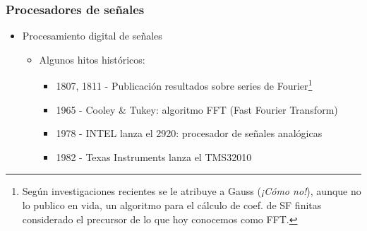 \begin{frame}\frametitle{Procesadores de señales}
  \begin{center}
  \end{center}
  \begin{itemize}
    \item Procesamiento digital de señales
    \begin{itemize}
      \item Algunos hitos históricos:
      \begin{itemize}
        \item 1807, 1811 - Publicación resultados sobre series de Fourier\footnote{Según investigaciones recientes se le atribuye a Gauss (\emph{¡Cómo no!}), aunque no lo publico en vida, un algoritmo para el cálculo de coef. de SF finitas considerado el precursor de lo que hoy conocemos como FFT.}
        \item 1965 - Cooley \& Tukey: algoritmo FFT (Fast Fourier Transform)
        \item 1978 - INTEL lanza el 2920: procesador de señales analógicas
        \item 1982 - Texas Instruments lanza el TMS32010\\

\end{itemize}
\end{itemize}
\end{itemize}
\end{frame}
